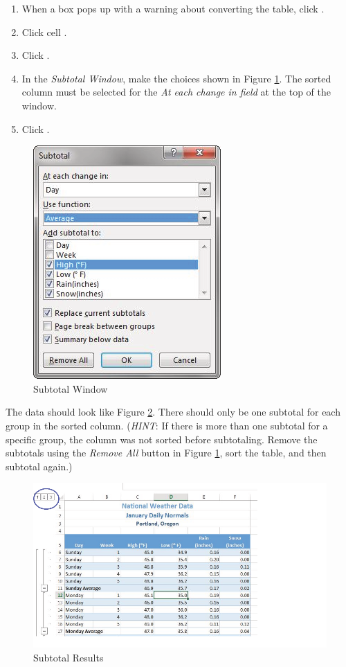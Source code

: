 \begin{enumbox}
\begin{enumerate}
		\item When a box pops up with a warning about converting the table, click .
		\item Click cell .
		\item Click .
		\item In the \textit{Subtotal Window}, make the choices shown in Figure \ref{05:fig24}. The sorted column must be selected for the \textit{At each change in field} at the top of the window. 
		\item Click .
	\end{enumerate}
\end{enumbox}
	
\begin{figure}[H]
	\centering
	\includegraphics[width=\maxwidth{.95\linewidth}]{gfx/ch05_fig24}
	\caption{Subtotal Window}
	\label{05:fig24}
\end{figure}

The data should look like Figure \ref{05:fig25}. There should only be one subtotal for each group in the sorted column. (\textit{HINT}: If there is more than one subtotal for a specific group, the column was not sorted before subtotaling. Remove the subtotals using the \textit{Remove All} button in Figure \ref{05:fig24}, sort the table, and then subtotal again.)

\begin{figure}[H]
	\centering
	\includegraphics[width=\maxwidth{.95\linewidth}]{gfx/ch05_fig25}
	\caption{Subtotal Results}
	\label{05:fig25}
\end{figure}

